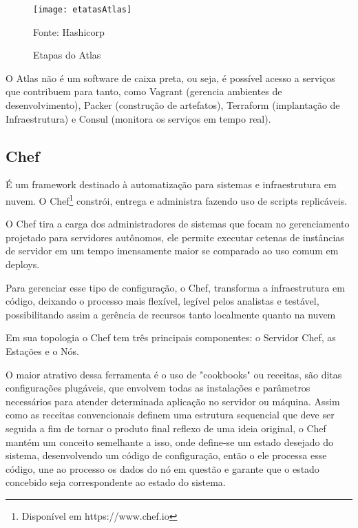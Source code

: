 \begin{figure}[htb]

	\centering
	\texttt{[image: etatasAtlas]}
	\caption{Etapas do Atlas}
	Fonte: Hashicorp\footnotemark
	\label{fig:etatasAtlas}


\end{figure}




O Atlas não é um software de caixa preta, ou seja, é possível acesso a serviços que contribuem para tanto, como Vagrant (gerencia ambientes de desenvolvimento), Packer (construção de artefatos), Terraform (implantação de Infraestrutura) e Consul (monitora os serviços em tempo real).

\subsection{Chef}

É um framework destinado à automatização para sistemas e infraestrutura em nuvem. O Chef\footnote{Disponível em https://www.chef.io} constrói, entrega e administra fazendo uso de scripts replicáveis.

O Chef tira a carga dos administradores de sistemas que focam no gerenciamento projetado para servidores autônomos, ele permite executar cetenas de instâncias de servidor em um tempo imensamente maior se comparado ao uso comum em deploys.

Para gerenciar esse tipo de configuração, o Chef, transforma a infraestrutura em código, deixando o processo mais flexível, legível pelos analistas e testável, possibilitando assim a gerência de recursos tanto localmente quanto na nuvem

Em sua topologia o Chef tem três principais componentes: o Servidor Chef, as Estações e o Nós.

O maior atrativo dessa ferramenta é o uso de "cookbooks" ou receitas, são ditas configurações plugáveis, que envolvem todas as instalações e parâmetros necessários para atender determinada aplicação no servidor ou máquina. Assim como as receitas convencionais definem uma estrutura sequencial que deve ser seguida a fim de tornar o produto final reflexo de uma ideia original, o Chef mantém um conceito semelhante a isso, onde define-se um estado desejado do sistema, desenvolvendo um código de configuração, então o ele processa esse código, une ao processo os dados do nó em questão e garante que o estado concebido seja correspondente ao estado do sistema. 

